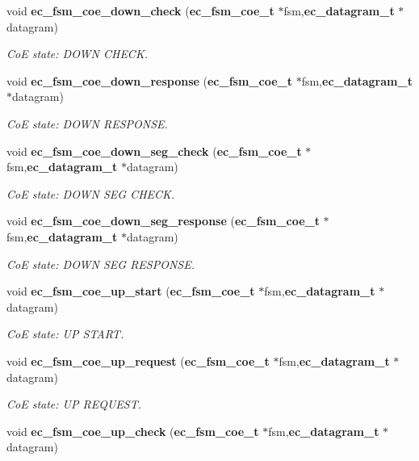 \begin{DoxyCompactItemize}
void {\bf ec\-\_\-fsm\-\_\-coe\-\_\-down\-\_\-check} ({\bf ec\-\_\-fsm\-\_\-coe\-\_\-t} $\ast$fsm,{\bf ec\-\_\-datagram\-\_\-t} $\ast$datagram)
\begin{DoxyCompactList}\small\item\em \-Co\-E state\-: \-D\-O\-W\-N \-C\-H\-E\-C\-K. \end{DoxyCompactList}\item 
void {\bf ec\-\_\-fsm\-\_\-coe\-\_\-down\-\_\-response} ({\bf ec\-\_\-fsm\-\_\-coe\-\_\-t} $\ast$fsm,{\bf ec\-\_\-datagram\-\_\-t} $\ast$datagram)
\begin{DoxyCompactList}\small\item\em \-Co\-E state\-: \-D\-O\-W\-N \-R\-E\-S\-P\-O\-N\-S\-E. \end{DoxyCompactList}\item 
void {\bf ec\-\_\-fsm\-\_\-coe\-\_\-down\-\_\-seg\-\_\-check} ({\bf ec\-\_\-fsm\-\_\-coe\-\_\-t} $\ast$fsm,{\bf ec\-\_\-datagram\-\_\-t} $\ast$datagram)
\begin{DoxyCompactList}\small\item\em \-Co\-E state\-: \-D\-O\-W\-N \-S\-E\-G \-C\-H\-E\-C\-K. \end{DoxyCompactList}\item 
void {\bf ec\-\_\-fsm\-\_\-coe\-\_\-down\-\_\-seg\-\_\-response} ({\bf ec\-\_\-fsm\-\_\-coe\-\_\-t} $\ast$fsm,{\bf ec\-\_\-datagram\-\_\-t} $\ast$datagram)
\begin{DoxyCompactList}\small\item\em \-Co\-E state\-: \-D\-O\-W\-N \-S\-E\-G \-R\-E\-S\-P\-O\-N\-S\-E. \end{DoxyCompactList}\item 
void {\bf ec\-\_\-fsm\-\_\-coe\-\_\-up\-\_\-start} ({\bf ec\-\_\-fsm\-\_\-coe\-\_\-t} $\ast$fsm,{\bf ec\-\_\-datagram\-\_\-t} $\ast$datagram)
\begin{DoxyCompactList}\small\item\em \-Co\-E state\-: \-U\-P \-S\-T\-A\-R\-T. \end{DoxyCompactList}\item 
void {\bf ec\-\_\-fsm\-\_\-coe\-\_\-up\-\_\-request} ({\bf ec\-\_\-fsm\-\_\-coe\-\_\-t} $\ast$fsm,{\bf ec\-\_\-datagram\-\_\-t} $\ast$datagram)
\begin{DoxyCompactList}\small\item\em \-Co\-E state\-: \-U\-P \-R\-E\-Q\-U\-E\-S\-T. \end{DoxyCompactList}\item 
void {\bf ec\-\_\-fsm\-\_\-coe\-\_\-up\-\_\-check} ({\bf ec\-\_\-fsm\-\_\-coe\-\_\-t} $\ast$fsm,{\bf ec\-\_\-datagram\-\_\-t} $\ast$datagram)

\end{DoxyCompactItemize}
